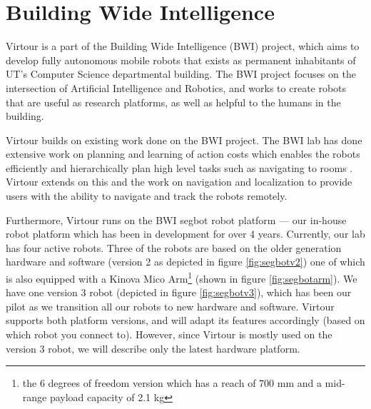 \documentclass[
  oneside,
  11pt, a4paper,
  footinclude=true,
  headinclude=true,
  cleardoublepage=empty
]{article}
\begin{document}
\section{Building Wide Intelligence}\label{sec:bwi}

Virtour is a part of the Building Wide Intelligence (BWI) project, which aims
to develop fully autonomous mobile robots that exists as permanent inhabitants
of UT's Computer Science departmental building. The BWI project focuses on the
intersection of Artificial Intelligence and Robotics, and works to create
robots that are useful as research platforms, as well as helpful to the humans
in the building.

Virtour builds on existing work done on the BWI project. The BWI lab has done
extensive work on planning and learning of action costs which enables the
robots efficiently and hierarchically plan high level tasks such as navigating
to rooms \citep{yang2014, khandelwal2014}. Virtour extends on this and the work
on navigation and localization to provide users with the ability to navigate
and track the robots remotely.

Furthermore, Virtour runs on the BWI segbot robot platform --- our in-house robot
platform which has been in development for over 4 years. Currently, our lab has
four active robots. Three of the robots are based on the older generation
hardware and software (version 2 as depicted in figure \ref{fig:segbotv2}) one
of which is also equipped with a Kinova Mico Arm\footnote{the 6 degrees of
freedom version which has a reach of 700 mm and a mid-range payload capacity of
2.1 kg} (shown in figure \ref{fig:segbotarm}).  We have one version 3 robot
(depicted in figure \ref{fig:segbotv3}), which has been our pilot as we
transition all our robots to new hardware and software.  Virtour supports both
platform versions, and will adapt its features accordingly (based on which
robot you connect to). However, since Virtour is mostly used on the version 3
robot, we will describe only the latest hardware platform.
\end{document}
